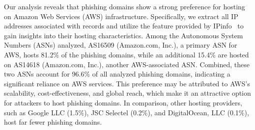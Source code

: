 Our analysis reveals that phishing domains show a strong preference for hosting on Amazon Web Services (AWS) infrastructure. 
Specifically, we extract all IP addresses associated with  records and utilize the  feature provided by IPinfo~\cite{IPSummar22:online} to gain insights into their hosting characteristics. 
Among the Autonomous System Numbers (ASNs) analyzed, AS16509 (Amazon.com, Inc.), a primary ASN for AWS, hosts 81.2\% of the phishing domains, while an additional 15.4\% are hosted on AS14618 (Amazon.com, Inc.), another AWS-associated ASN. 
Combined, these two ASNs account for 96.6\% of all analyzed phishing domains, indicating a significant reliance on AWS services. 
This preference may be attributed to AWS’s scalability, cost-effectiveness, and global reach, which make it an attractive option for attackers to host phishing domains. 
In comparison, other hosting providers, such as Google LLC (1.5\%), JSC Selectel (0.2\%), and DigitalOcean, LLC (0.1\%), host far fewer phishing domains. 

